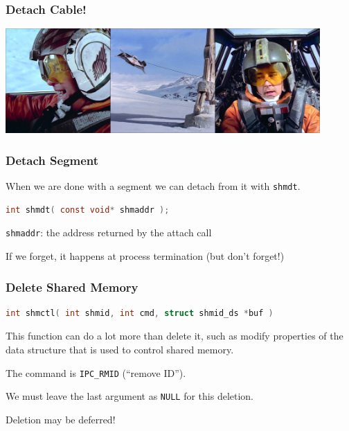 \begin{frame}
	\frametitle{Detach Cable!}

	\begin{center}
		\includegraphics[width=0.9\textwidth]{images/detach-cable.jpg}
	\end{center}


\end{frame}

\begin{frame}[fragile]
	\frametitle{Detach Segment}

	When we are done with a segment we can detach from it with \texttt{shmdt}.

	\begin{lstlisting}[language=C]
int shmdt( const void* shmaddr );
\end{lstlisting}

	\texttt{shmaddr}: the address returned by the attach call

	If we forget, it happens at process termination (but don't forget!)
\end{frame}

\begin{frame}[fragile]
	\frametitle{Delete Shared Memory}
	\begin{lstlisting}[language=C]
int shmctl( int shmid, int cmd, struct shmid_ds *buf )
\end{lstlisting}

	This function can do a lot more than delete it, such as modify properties of the data structure that is used to control shared memory.

	The command is  \texttt{IPC\_RMID} (``remove ID'').

	We must leave the last argument as \texttt{NULL} for this deletion.

	Deletion may be deferred!

\end{frame}


